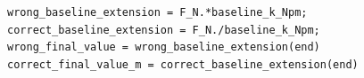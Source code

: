 \documentclass[border=12pt]{standalone}
\begin{document}
\begin{lstlisting}[style=matlab]
wrong_baseline_extension = F_N.*baseline_k_Npm;
correct_baseline_extension = F_N./baseline_k_Npm;
wrong_final_value = wrong_baseline_extension(end)
correct_final_value_m = correct_baseline_extension(end)
\end{lstlisting}
\end{document}
